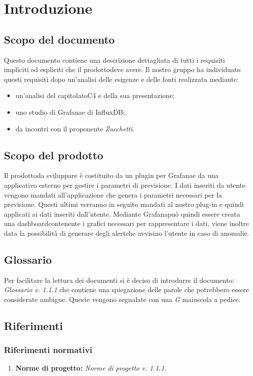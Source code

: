 
\section{Introduzione}
	\subsection{Scopo del documento}
	Questo documento contiene una descrizione dettagliata di tutti i requisiti impliciti ed espliciti che il prodotto\glosp deve avere. Il nostro gruppo ha individuato questi requisiti dopo un'analisi delle esigenze e delle fonti realizzata mediante: 
	\begin{itemize}
		\item un'analisi del capitolato\glosp C4 e della sua presentazione; 
		\item uno studio di Grafana\glosp e di InfluxDB;
		\item da incontri con il proponente \textit{Zucchetti}.
	\end{itemize}
	\subsection{Scopo del prodotto}
	Il prodotto\glosp da sviluppare è costituito da un plugin per Grafana\glosp e da una applicativo esterno per gestire i parametri di previsione. I dati inseriti da utente vengono mandati all'applicazione che genera i parametri necessari per la previsione. Questi ultimi verranno in seguito mandati al nostro plug-in e quindi applicati ai dati inseriti dall'utente. Mediante Grafana\glosp può quindi essere creata una dashboard\glosp contenente i grafici necessari per rappresentare i dati, viene inoltre data la possibilità di generare degli alert\glosp che avvisino l'utente in caso di anomalie.
		
	\subsection{Glossario}
	Per facilitare la lettura dei documenti si è deciso di introdurre il documento: \textit{Glossario v. 1.1.1} che contiene una spiegazione delle parole che potrebbero essere considerate ambigue. Queste vengono segnalate con una \textit{G} maiuscola a pedice.  
	\subsection{Riferimenti}
		\subsubsection{Riferimenti normativi}
			\begin{enumerate}
				\item \textbf{Norme di progetto:} \textit{Norme di progetto v. 1.1.1}.
			\end{enumerate}
